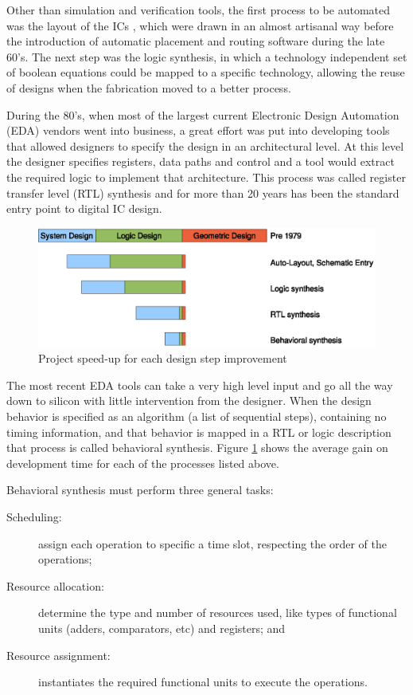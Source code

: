 \documentclass[a4paper, 12pt]{article}
\begin{document}
	Other than simulation and verification tools, the first process to be automated was the layout of the ICs \cite{synthesisbook}, which were drawn in an almost artisanal way before the introduction of automatic placement and routing software during the late 60's. The next step was the logic synthesis, in which a technology independent set of boolean equations could be mapped to a specific technology, allowing the reuse of designs when the fabrication moved to a better process.

	During the 80's, when most of the largest current Electronic Design Automation (EDA) vendors went into business, a great effort was put into developing tools that allowed designers to specify the design in an architectural level. At this level the designer specifies registers, data paths and control and a tool would extract the required logic to implement that architecture. This process was called register transfer level (RTL) synthesis and for more than 20 years has been the standard entry point to digital IC design.

\begin{figure}[h]
\centering
\includegraphics{figs/designeffort.eps}
\caption{Project speed-up for each design step improvement}
\label{fig:synthgains}
\end{figure}

	The most recent EDA tools can take a very high level input and go all the way down to silicon with little intervention from the designer. When the design behavior is specified as an algorithm (a list of sequential steps), containing no timing information, and that behavior is mapped in a RTL or logic description that process is called behavioral synthesis. Figure \ref{fig:synthgains} shows the average gain on development time for each of the processes listed above.


	Behavioral synthesis must perform three general tasks:
\begin{description}
\item[Scheduling:] assign each operation to specific a time slot, respecting the order of the operations;
\item[Resource allocation:] determine the type and number of resources used, like types of functional units (adders, comparators, etc) and registers; and
\item[Resource assignment:] instantiates the required functional units to execute the operations.
\end{description}
\end{document}
